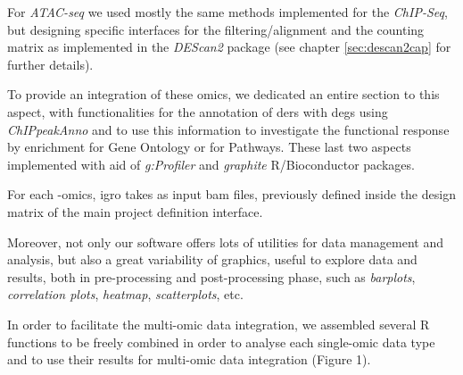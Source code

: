 For \textit{ATAC-seq} we used mostly the same methods implemented for the \textit{ChIP-Seq}, but designing specific interfaces for the filtering/alignment and the counting matrix as implemented in the \textit{DEScan2} package (see chapter \ref{sec:descan2cap} for further details).

To provide an integration of these omics, we dedicated an entire section to this aspect, with functionalities for the annotation of \glspl{der} with \glspl{deg} using \textit{ChIPpeakAnno} and to use this information to investigate the functional response by enrichment for Gene Ontology or for Pathways.
These last two aspects implemented with aid of \textit{g:Profiler} \cite{Reimand2016} and \textit{graphite} \cite{Sales2012a} R/Bioconductor packages.


For each -omics, \gls{igro} takes as input \gls{bam} files, previously defined inside the design matrix of the main project definition interface.

Moreover, not only our software offers lots of utilities for data management and analysis, but also a great variability of graphics, useful to explore data and results, both in pre-processing and post-processing phase, such as \textit{barplots}, \textit{correlation plots}, \textit{heatmap}, \textit{scatterplots}, etc.

In order to facilitate the multi-omic data integration, we assembled several R functions to be freely combined in order to analyse each single-omic data type and to use their results for multi-omic data integration (Figure 1).